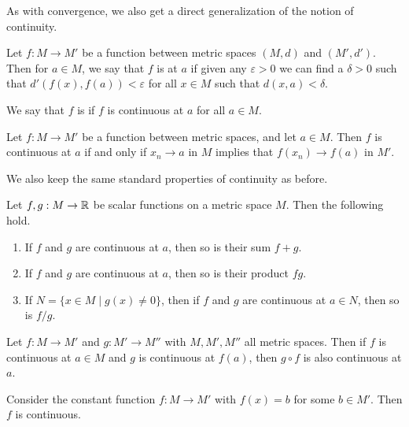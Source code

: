 \documentclass[a4paper]{scrartcl}
\begin{document}
As with convergence, we also get a direct generalization of the notion of continuity.

\begin{definition}[Continuity]
    Let $f: M \rightarrow M'$ be a function between metric spaces $(M, d)$ and $(M', d')$. Then for $a \in M$, we say that $f$ is  at $a$ if given any $\varepsilon > 0$ we can find a $\delta > 0$ such that $d'(f(x), f(a)) < \varepsilon$ for all $x \in M$ such that $d(x, a) < \delta$.

    We say that $f$ is  if $f$ is continuous at $a$ for all $a \in M$.
\end{definition}

\begin{proposition}
    Let $f: M \rightarrow M'$ be a function between metric spaces, and let $a \in M$. 
    Then $f$ is continuous at $a$ if and only if $x_n \rightarrow a$ in $M$ implies that $f(x_n) \rightarrow f(a)$ in $M'$.
\end{proposition}

We also keep the same standard properties of continuity as before.

\begin{proposition}
	Let $f, g: M \rightarrow \mathbb{R}$ be scalar functions on a metric space $M$. Then the following hold.
	\begin{enumerate}[label=(\roman*)]
		\item If $f$ and $g$ are continuous at $a$, then so is their sum $f + g$.
		\item If $f$ and $g$ are continuous at $a$, then so is their product $fg$.
		\item If $N = \{x \in M \mid g(x)\neq 0\}$, then if $f$ and $g$ are continuous at $a \in N$, then so is $f/g$.
	\end{enumerate}
\end{proposition}

\begin{proposition}
	Let $f: M \rightarrow M'$ and $g: M' \rightarrow M''$ with $M, M', M''$ all metric spaces. Then if $f$ is continuous at $a \in M$ and $g$ is continuous at $f(a)$, then $g \circ f$ is also continuous at $a$.
\end{proposition}

\begin{example}
    Consider the constant function $f: M \rightarrow M'$ with $f(x) = b$ for some $b \in M'$. Then $f$ is continuous.
\end{example}
\end{document}
